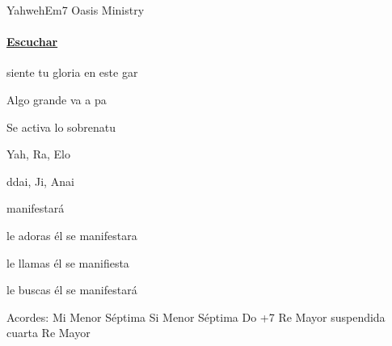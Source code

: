\documentclass[12pt, spanish]{book}
\begin{document}
    \begin{song}{Yahweh}{Em7}
    {} %
    {Oasis Ministry}
    {} %
    {}
        \ifChordBk
        \paragraph{\mbox{}\hfill\protect\href{https://open.spotify.com/intl-es/track/04hV8gSYwrEmzwC05AQY4j}{Escuchar}\mbox{}\hfill}
        \fi

        \begin{SBOpGroup}
             siente tu gloria en este gar

            Algo grande va a pa

            Se activa lo sobrenatu
        \end{SBOpGroup}

        \begin{SBChorus}
            Yah, Ra, Elo

            ddai, Ji, Anai

             manifestará
        \end{SBChorus}

        \begin{SBOpGroup}
             le adoras él se manifestara

             le llamas él se manifiesta

             le buscas él se manifestará
        \end{SBOpGroup}

        \ifChordBk
        \begin{SBOpGroup}
            Acordes:\break
            \upchord{\Emseven}\qquad Mi Menor S\'eptima \hfill
            \upchord{\Bmseven}\qquad Si Menor S\'eptima \hfill\null\break
            \upchord{\CMaj}\qquad Do +7 \hfill
            \upchord{\Dsus}Re Mayor suspendida cuarta \hfill\null\break
            \upchord{\D}\qquad Re Mayor \hfill\null\break
        \end{SBOpGroup}
        \fi
    \end{song}
\end{document}
